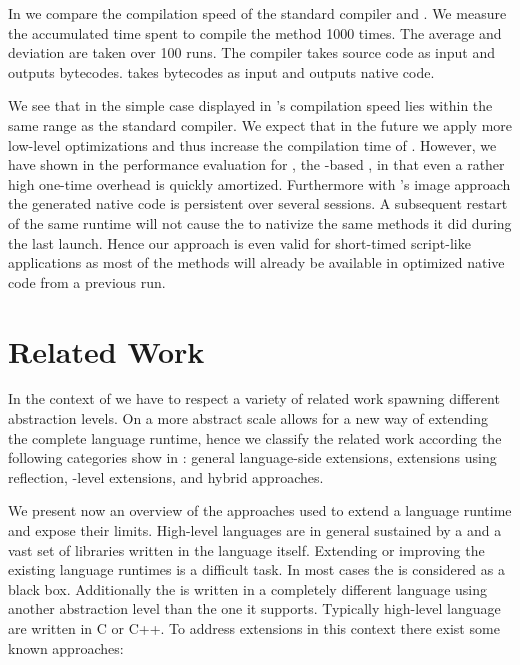 \noindent In  we compare the compilation speed of the standard \PH compiler and \NBJ.
We measure the accumulated time spent to compile the method 1000 times.
The average and deviation are taken over 100 runs. 
The \PH compiler takes source code as input and outputs \PH bytecodes.
\NBJ takes bytecodes as input and outputs native code.

We see that in the simple case displayed in  \NBJ's compilation speed lies within the same range as the standard \PH compiler.
We expect that in the future we apply more low-level optimizations and thus increase the compilation time of \NBJ.
However, we have shown in the performance evaluation for \NB, the \B-based \FFI, in  that even a rather high one-time overhead is quickly amortized.
Furthermore with \PH's image approach the generated native code is persistent over several sessions.
A subsequent restart of the same runtime will not cause the \JIT to nativize the same methods it did during the last launch.
Hence our approach is even valid for short-timed script-like applications as most of the methods will already be available in optimized native code from a previous run.


\section{Related Work}
In the context of \B we have to respect a variety of related work spawning different abstraction levels.
On a more abstract scale \B allows for a new way of extending the complete language runtime, hence we classify the related work according the following categories show in : general language-side extensions, extensions using reflection, \VM-level extensions, and hybrid approaches.

We present now an overview of the approaches used to extend a language runtime and expose their limits.
High-level languages are in general sustained by a \VM and a vast set of libraries written in the language itself. 
Extending or improving the existing language runtimes is a difficult task.
In most cases the \VM is considered as a black box.
Additionally the \VM is written in a completely different language using another abstraction level than the one it supports.
Typically high-level language \VMs are written in C or C++.
To address extensions in this context there exist some known approaches:

